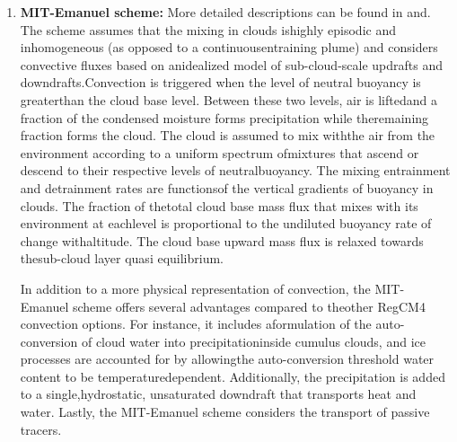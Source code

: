 {\begin{enumerate}
where $\tau$ is the $ABE$ removal time scale.

The fundamental difference between the two assumptions is that the AS74 closure
assumption relates the convective fluxes and rainfall to the tendencies in the
state of the atmosphere, while the FC80 closure assumption relates the
convective fluxes to the degree of instability in the atmosphere. Both schemes
achieve a statistical equilibrium between convection and the large-scale
processes.

A number of parameters present in the scheme can be used to optimize its
performance, and \cite{Giorgi_93c} discusses a wide range of sensitivity
experiments. We found that the parameter to which the scheme is most sensitive
is by and large the fraction of precipitation evaporated in the downdraft
(Peff, with values from 0 to 1), which essentially measures the precipitation
efficiency. Larger values of Peff lead to reduced precipitation.

\item {\bf MIT-Emanuel scheme:} 
More detailed descriptions can be found
in \citet{Emanuel_91} and\citet{Emanuel_99}.  The scheme assumes that the
mixing in clouds ishighly episodic and inhomogeneous (as opposed to a
continuousentraining plume) and considers convective fluxes based on
anidealized model of sub-cloud-scale updrafts and downdrafts.Convection is
triggered when the level of neutral buoyancy is greaterthan the cloud base
level.  Between these two levels, air is liftedand a fraction of the condensed
moisture forms precipitation while theremaining fraction forms the cloud.  The
cloud is assumed to mix withthe air from the environment according to a
uniform spectrum ofmixtures that ascend or descend to their respective levels
of neutralbuoyancy.  The mixing entrainment and detrainment rates are
functionsof the vertical gradients of buoyancy in clouds.  The fraction of
thetotal cloud base mass flux that mixes with its environment at eachlevel
is proportional to the undiluted buoyancy rate of change withaltitude.  The
cloud base upward mass flux is relaxed towards thesub-cloud layer quasi
equilibrium.

In addition to a more physical representation of convection, the MIT-Emanuel
scheme offers several advantages compared to theother RegCM4 convection
options.  For instance, it includes aformulation of the auto-conversion of
cloud water into precipitationinside cumulus clouds, and ice processes are
accounted for by allowingthe auto-conversion threshold water content to be
temperaturedependent.  Additionally, the precipitation is added to a
single,hydrostatic, unsaturated downdraft that transports heat and
water. Lastly, the MIT-Emanuel scheme considers the transport of passive
tracers.


\end{enumerate}}
